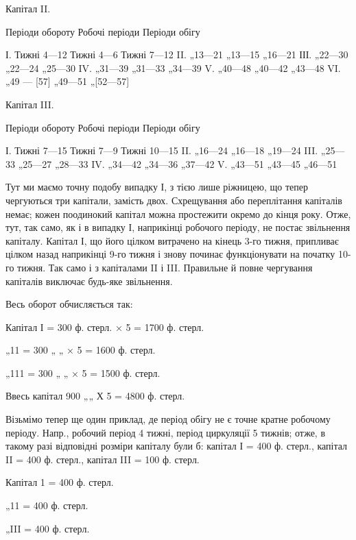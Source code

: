 Капітал II.

Періоди обороту    Робочі періоди    Періоди обігу

І. Тижні    4—12    Тижні 4—6    Тижні 7—12
II. „13—21 „13—15 „16—21
ІІІ. „22—30 „22—24 „25—30
IV. „31—39 „31—33 „34—39
V. „40—48 „40—42 „43—48
VI. „49 — [57] „49—51 „[52—57]

  Капітал III.

Періоди обороту    Робочі періоди    Періоди обігу

І. Тижні    7—15    Тижні 7—9    Тижні 10—15
II. „16—24 „16—18 „19—24
III. „25—33 „25—27 „28—33
IV. „34—42 „34—36 „37—42
V. „43—51 „43—45 „46—51

Тут ми маємо точну подобу випадку І, з тією лише ріжницею, що
тепер чергуються три капітали, замість двох. Схрещування або переплітання
капіталів немає; кожен поодинокий капітал можна простежити
окремо до кінця року. Отже, тут, так само, як і в випадку І, наприкінці
робочого періоду, не постає звільнення капіталу. Капітал І, що його цілком
витрачено на кінець 3-го тижня, припливає цілком назад наприкінці 9-го
тижня і знову починає функціонувати на початку 10-го тижня. Так само і з
капіталами II і III. Правильне й повне чергування капіталів виключає
будь-яке звільнення.

Весь оборот обчисляється так:

Капітал І = 300 ф. стерл. × 5 = 1700 ф. стерл.

„11 = 300 „ „   × 5 = 1600 ф. стерл.

„111 = 300 „ „    × 5 = 1500 ф. стерл.

Ввесь капітал   900 „„    Х 5 = 4800 ф. стерл.

Візьмімо тепер ще один приклад, де період обігу не є точне кратне
робочому періоду. Напр., робочий період 4 тижні, період циркуляції
5 тижнів; отже, в такому разі відповідні розміри капіталу були б:
капітал І = 400 ф. стерл., капітал II = 400 ф. стерл., капітал III = 100 ф. стерл.

Капітал 1 = 400 ф. стерл.

„11 = 400 ф. стерл.

„III = 400 ф. стерл.
